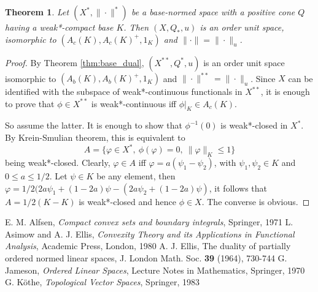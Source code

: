 \documentclass[12pt]{article}
\newtheorem{thm}{Theorem}
\theoremstyle{remark}
\newcommand{\<}{\langle}
\begin{document}
\begin{thm} Let $(X^*,\|\cdot\|^*)$ be a base-normed space with a positive cone $Q$ having a weak*-compact base $K$. 
Then $(X,Q_*,u)$ is an order unit space, isomorphic to $(A_c(K),A_c(K)^+,1_K)$ and $\|\cdot\|=\|\cdot\|_u$.

\end{thm}

\begin{proof}  By Theorem \ref{thm:base_dual}, $(X^{**},Q^*,u)$ is an order unit space  isomorphic to $(A_b(K),A_b(K)^+,1_K)$
 and $\|\cdot\|^{**}=\|\cdot\|_u$. Since $X$ can be identified with the subspace of weak*-continuous functionals in $X^{**}$, it is enough to prove that $\phi\in X^{**}$ is weak*-continuous iff $\phi|_K\in A_c(K)$. 

So assume the latter. It is enough to show that $\phi^{-1}(0)$ is weak*-closed in $X^*$. By Krein-Smulian theorem, this is equivalent to 
\[
A=\{\varphi\in X^*,\ \phi(\varphi)=0,\ \|\varphi\|_K\le 1\}
\]
being weak*-closed. Clearly, $\varphi\in A$ iff $\varphi=a(\psi_1-\psi_2)$, with $\psi_1,\psi_2\in K$ and $0\le a\le 1/2$. Let $\psi\in K$ be any element, then $\varphi= 1/2(2a\psi_1+(1-2a)\psi -(2a\psi_2+(1-2a)\psi)$, it follows that $A=1/2(K-K)$ 
 is weak*-closed and hence $\phi\in X$. The converse is obvious.


\end{proof}




\begin{thebibliography}{99}
 E. M. Alfsen, \emph{Compact convex sets and boundary integrals}, Springer, 1971
 L. Asimow and A. J. Ellis, \emph{ Convexity Theory and its Applications in Functional Analysis}, Academic Press, London, 1980
 A. J. Ellis, The duality of partially ordered normed linear spaces, J. London Math. Soc. \textbf{39} (1964), 730-744
G. Jameson, \emph{Ordered Linear Spaces}, Lecture Notes in Mathematics, Springer, 1970
 G. K\" othe, \emph{Topological Vector Spaces}, Springer, 1983
\end{thebibliography}
\end{document}
